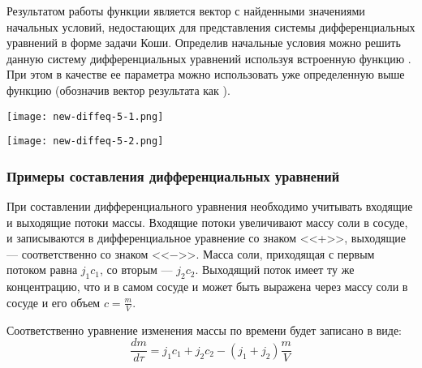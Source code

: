 Результатом работы функции  является вектор с найденными значениями начальных условий, недостающих для представления системы дифференциальных уравнений в форме задачи Коши. Определив начальные условия можно решить данную систему дифференциальных уравнений используя встроенную функцию .  При этом  в качестве  ее параметра  можно использовать уже определенную выше функцию  (обозначив вектор результата как ).

\begin{center}
	\texttt{[image: new-diffeq-5-1.png]}
\end{center}

\begin{center}
	\texttt{[image: new-diffeq-5-2.png]}
\end{center}

\subsubsection*{Примеры составления дифференциальных уравнений}

При составлении дифференциального уравнения необходимо учитывать входящие и выходящие потоки массы. Входящие потоки увеличивают массу соли в сосуде, и записываются в дифференциальное уравнение со знаком <<+>>, выходящие --- соответственно со знаком <<$-$>>. Масса соли, приходящая с первым потоком равна $j_1 c_1$, со вторым --- $j_2 c_2$. Выходящий поток имеет ту же концентрацию, что и в самом сосуде и может быть выражена через массу соли в сосуде и его объем $c=\frac{m}{V}$.

Соответственно уравнение изменения массы по времени будет записано в виде:
\begin{equation}
\dfrac{d m}{d \tau} = j_1 c_1 + j_2 c_2 - (j_1 + j_2 ) \dfrac{m}{V}
\end{equation}

